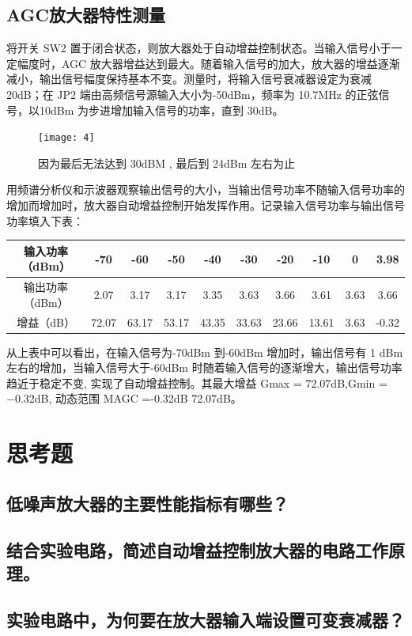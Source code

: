 \documentclass{../source/Experiment}
\begin{document}
        \subsection{AGC放大器特性测量}

            将开关 SW2 置于闭合状态，则放大器处于自动增益控制状态。当输入信号小于一定幅度时，AGC 放大器增益达到最大。随着输入信号的加大，放大器的增益逐渐减小，输出信号幅度保持基本不变。测量时，将输入信号衰减器设定为衰减 20dB；在 JP2 端由高频信号源输入大小为-50dBm，频率为 10.7MHz 的正弦信号，以10dBm 为步进增加输入信号的功率，直到 30dB。

            \begin{figure}[H]
                \centering
                \texttt{[image: 4]}
                \caption{因为最后无法达到 30dBM , 最后到 24dBm 左右为止}
            \end{figure}

            用频谱分析仪和示波器观察输出信号的大小，当输出信号功率不随输入信号功率的增加而增加时，放大器自动增益控制开始发挥作用。记录输入信号功率与输出信号功率填入下表：

            \begin{table}[H]
                \begin{tabular}{|c|c|c|c|c|c|c|c|c|c|}
                \hline
                输入功率（dBm） & -70   & -60   & -50   & -40   & -30   & -20   & -10   & 0    & 3.98  \\ \hline
                输出功率（dBm） & 2.07  & 3.17  & 3.17  & 3.35  & 3.63  & 3.66  & 3.61  & 3.63 & 3.66  \\ \hline
                增益（dB）    & 72.07 & 63.17 & 53.17 & 43.35 & 33.63 & 23.66 & 13.61 & 3.63 & -0.32 \\ \hline
                \end{tabular}
            \end{table}

            从上表中可以看出，在输入信号为-70dBm 到-60dBm 增加时，输出信号有 1 dBm 左右的增加，当输入信号大于-60dBm 时随着输入信号的逐渐增大，输出信号功率趋近于稳定不变, 实现了自动增益控制。其最大增益 Gmax = 72.07dB,Gmin = −0.32dB, 动态范围 MAGC =-0.32dB 72.07dB。

    \section{思考题}
	    \subsection{低噪声放大器的主要性能指标有哪些？}
       
        \subsection{结合实验电路，简述自动增益控制放大器的电路工作原理。
        }
        
        \subsection{实验电路中，为何要在放大器输入端设置可变衰减器？}
	
\end{document}
